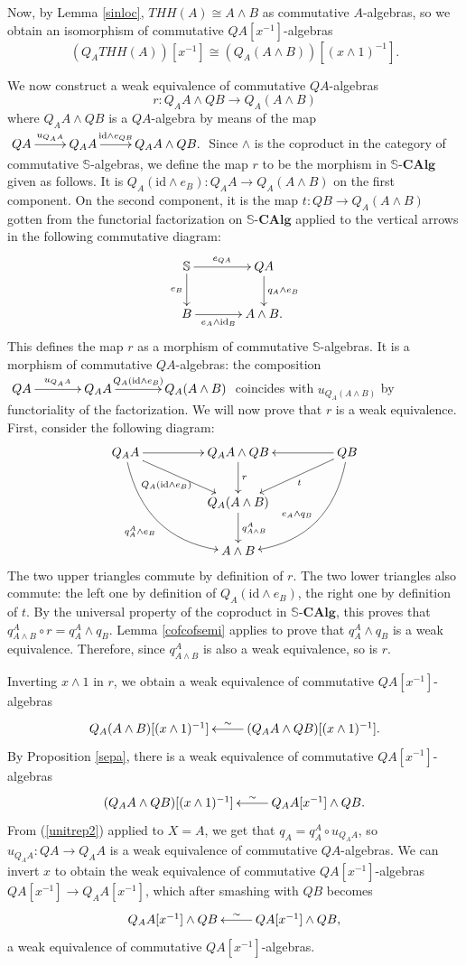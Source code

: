 \documentclass[a4paper,11pt]{amsart} %
\theoremstyle{definition} \newtheorem{defn}[equation]{Definition}
\theoremstyle{remark} \newtheorem{notation}[equation]{Notation}
\theoremstyle{plain} \newtheorem{teo}[equation]{Theorem}
\theoremstyle{plain} \newtheorem{lema}[equation]{Lemma}
\theoremstyle{plain} \newtheorem{prop}[equation]{Proposition}
\theoremstyle{plain} \newtheorem{corolario}[equation]{Corollary}
\theoremstyle{remark} \newtheorem{obs}[equation]{Remark}
\theoremstyle{remark} \newtheorem{sideobs}[equation]{Side remark}
\theoremstyle{remark} \newtheorem{ejercicio}[equation]{Exercise}
\theoremstyle{definition} \newtheorem{notn}[equation]{Notation}
\theoremstyle{remark} \newtheorem{ej}[equation]{Example}
\theoremstyle{remark} \newtheorem{contraej}[equation]{Counterexample}
\theoremstyle{plain} \newtheorem{conj}[equation]{Conjecture}
\renewcommand{\1}{\ensuremath{\mathbbm{1}}}
\renewcommand{\S}{\mathbb{S}}
\newcommand{\id}{\mathrm{id}}
\newcommand{\SCAlg}{\ensuremath{\mathbb{S}}\mbox{-}\ensuremath{\mathbf{CAlg}}}
\numberwithin{equation}{section}
\begin{document}
Now, by Lemma \ref{sinloc}, $THH(A)\cong A \wedge B$ as commutative $A$-algebras, so we obtain an isomorphism of commutative $QA[x^{-1}]$-algebras
\[(Q_A THH(A))[x^{-1}] \cong (Q_A(A \wedge B))[(x\wedge 1)^{-1}].\]

We now construct a weak equivalence of commutative $QA$-algebras \[ r: Q_AA \wedge QB \to Q_A(A \wedge B)\]
where $Q_AA\wedge QB$ is a $QA$-algebra by means of the map $\xymatrix{QA\ar[r]^-{u_{Q_AA}} & Q_AA \ar[r]^-{\id \wedge e_{QB}} & Q_AA \wedge QB.}$ Since $\wedge$ is the coproduct in the category of commutative $\S$-algebras, we define the map $r$ to be the morphism in $\SCAlg$ given as follows. It is $Q_A(\id \wedge e_B):Q_AA \to Q_A(A\wedge B)$ on the first component. On the second component, it is the map $t:QB\to Q_A(A\wedge B)$ gotten from the functorial factorization on $\SCAlg$ applied to the vertical arrows in the following commutative diagram:
\[\xymatrix@C+1pc{\S \ar[r]^-{e_{QA}} \ar[d]_-{e_B} & QA \ar[d]^-{q_A \wedge e_B} \\ B\ar[r]_-{e_A\wedge \id_B} & A \wedge B.  }\]
This defines the map $r$ as a morphism of commutative $\S$-algebras. It is a morphism of commutative $QA$-algebras: the composition $\xymatrix@C+1pc{QA \ar[r]^-{u_{Q_AA}} & Q_AA \ar[r]^-{Q_A(\id\wedge e_B)} & Q_A(A\wedge B)}$ coincides with $u_{Q_A(A\wedge B)}$ by functoriality of the factorization. We will now prove that $r$ is a weak equivalence. First, consider the following diagram:
\[\xymatrix@C+2pc{Q_AA \ar[r] \ar[rd]_-{Q_A(\id\wedge e_B)} \ar@/_2pc/[rdd]_-{q^A_A\wedge e_B} & Q_AA \wedge QB \ar[d]^-r & QB \ar[l] \ar[ld]^-t \ar@/^2pc/[ldd]_-{\ \ e_A\wedge q_B} \\ & Q_A(A\wedge B) \ar[d]^-{q^A_{A\wedge B}} \\ & A\wedge B  }\]
%
The two upper triangles commute by definition of $r$. The two lower triangles also commute: the left one by definition of $Q_A(\id\wedge e_B)$, the right one by definition of $t$. By the universal property of the coproduct in $\SCAlg$, this proves that $q^A_{A\wedge B} \circ r=q_A^A \wedge q_B$. %
Lemma \ref{cofcofsemi} applies to prove that $q_A^A \wedge q_B$ is a weak equivalence. Therefore, since $q^A_{A\wedge B}$ is also a weak equivalence, so is $r$.

%
%
%
%
%
%
%
%
%
%
%
%
%
%
Inverting $x\wedge 1$ in $r$, we obtain a weak equivalence of commutative $QA[x^{-1}]$-algebras
\[ %
\xymatrix{Q_A(A \wedge B)[(x\wedge 1)^{-1}] & \ar[l]_-\sim (Q_AA \wedge Q B)[(x\wedge 1)^{-1}].}\]
By Proposition \ref{sepa}, there is a weak equivalence of commutative $QA[x^{-1}]$-algebras
\begin{equation}\label{vers}\xymatrix{(Q_AA \wedge Q B)[(x\wedge 1)^{-1}] & \ar[l]_-\sim Q_AA[x^{-1}] \wedge QB. }\end{equation}
From (\ref{unitrep2}) applied to $X=A$, we get that $q_A=q_A^A\circ u_{Q_AA}$, so $u_{Q_AA}:QA\to Q_AA$ is a weak equivalence of commutative $QA$-algebras. %
%
We can invert $x$ to obtain the weak equivalence of commutative $QA[x^{-1}]$-algebras $QA[x^{-1}]\to Q_AA[x^{-1}]$, which after smashing with $QB$ becomes
\[\xymatrix{Q_A A[x^{-1}] \wedge QB & QA[x^{-1}] \wedge QB, \ar[l]_-\sim }\] %
a weak equivalence of commutative $QA[x^{-1}]$-algebras.
\end{document}
